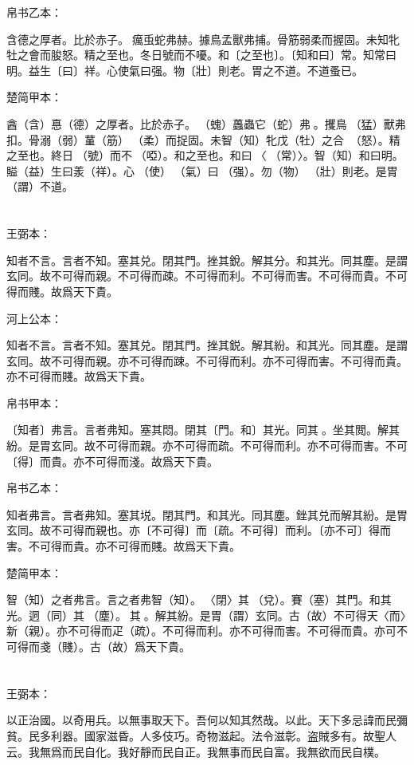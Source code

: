 \documentclass[a5paper]{ctexbook}
\begin{document}
    帛书乙本：

    含德之厚者。比於赤子。𧒒癘䖝蛇弗赫。據鳥孟獸弗捕。骨筋弱柔而握固。未知牝牡之會而朘怒。精之至也。冬日號而不嚘。和〔之至也〕。〔知和曰〕常。知常曰明。益生〔曰〕祥。心使氣曰强。物〔壯〕則老。胃之不道。不道蚤已。

    楚简甲本：

    酓（含）惪（德）之厚者。比於赤子。󶵎（螝）䘍蟲它（蛇）弗𧍷。攫鳥󶵏（猛）獸弗扣。骨溺（弱）蓳（筋）󶵐（柔）而捉固。未智（知）牝戊（牡）之合󶵑󶵒（怒）。精之至也。終日󶴋（號）而不𪬐（啞）。和之至也。和曰󶵓〈󼲗（常）〉。智（知）和曰明。賹（益）生曰羕（祥）。心󶴎（使）󶴓（氣）曰󶴔（强）。勿（物）𡒉（壯）則老。是胃（謂）不道。

    \chapter{}
    王弼本：

    知者不言。言者不知。塞其兑。閉其門。挫其銳。解其分。和其光。同其塵。是謂玄同。故不可得而親。不可得而疎。不可得而利。不可得而害。不可得而貴。不可得而賤。故爲天下貴。

    河上公本：

    知者不言。言者不知。塞其兑。閉其門。挫其鋭。解其紛。和其光。同其塵。是謂玄同。故不可得而親。亦不可得而踈。不可得而利。亦不可得而害。不可得而貴。亦不可得而賤。故爲天下貴。

    帛书甲本：

    〔知者〕弗言。言者弗知。塞其悶。閉其〔門。和〕其光。同其𡑁。坐其閲。解其紛。是胃玄同。故不可得而親。亦不可得而疏。不可得而利。亦不可得而害。不可〔得〕而貴。亦不可得而淺。故爲天下貴。

    帛书乙本：

    知者弗言。言者弗知。塞其㙂。閉其門。和其光。同其塵。銼其兑而解其紛。是胃玄同。故不可得而親也。亦〔不可得〕而〔疏。不可得〕而利。〔亦不可〕得而害。不可得而貴。亦不可得而賤。故爲天下貴。

    楚简甲本：

    智（知）之者弗言。言之者弗智（知）。𨳮〈閉〉其𨓚（兌）。賽（塞）其門。和其光。迵（同）其󶴤（塵）。󶴤其󶩴。解其紛。是胃（謂）玄同。古（故）不可得天〈而〉新（親）。亦不可得而疋（疏）。不可得而利。亦不可得而害。不可得而貴。亦可不可得而戔（賤）。古（故）爲天下貴。

    \chapter{}
    王弼本：

    以正治國。以奇用兵。以無事取天下。吾何以知其然哉。以此。天下多忌諱而民彌貧。民多利器。國家滋昏。人多伎巧。奇物滋起。法令滋彰。盗賊多有。故聖人云。我無爲而民自化。我好靜而民自正。我無事而民自富。我無欲而民自樸。
\end{document}

